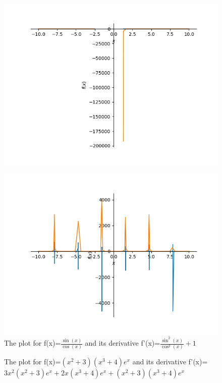 \documentclass{article}
\begin{document}
\begin{figure}
\includegraphics{plot_26}
\end{figure}\begin{figure}
\caption{The plot for f(x)=$\frac{\sin{\left(x \right)}}{\cos{\left(x \right)}}$ and its derivative f'(x)=$\frac{\sin^{2}{\left(x \right)}}{\cos^{2}{\left(x \right)}} + 1$}
\centering
\includegraphics{plot_27}
\end{figure}\begin{figure}
\caption{The plot for f(x)=$\left(x^{2} + 3\right) \left(x^{3} + 4\right) e^{x}$ and its derivative f'(x)=$3 x^{2} \left(x^{2} + 3\right) e^{x} + 2 x \left(x^{3} + 4\right) e^{x} + \left(x^{2} + 3\right) \left(x^{3} + 4\right) e^{x}$}
\centering

\end{figure}
\end{document}
